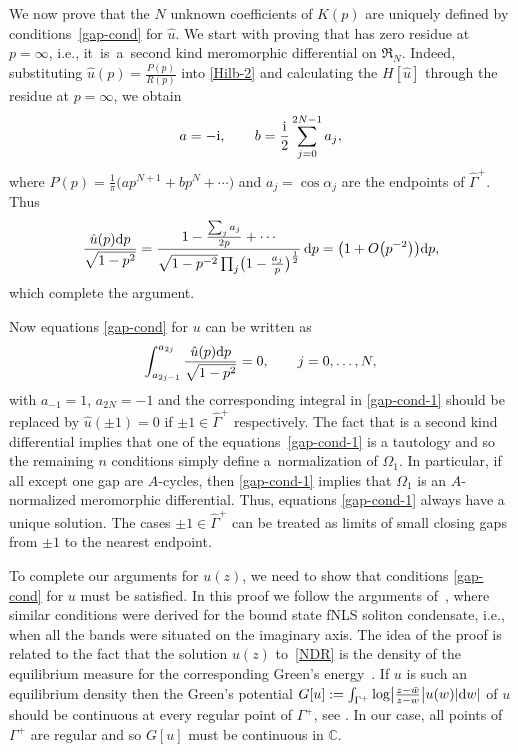 \documentclass[10pt,a4paper]{amsart}
\numberwithin{equation}{section}
\newcommand{\G}{\Gamma}
\def\C{{\mathbb C}}
\def\a{\alpha}
\def\hf{\frac{1}{2}}
\def\G{\Gamma}
\begin{document}
We now prove that the $N$ unknown coefficients of $K(p)$ are uniquely defined by conditions~\eqref{gap-cond} for $\hat u$. We start with proving that  has zero residue at $p=\infty$, i.e., it~is~a~second kind meromorphic differential on $\mathfrak{R}_N$. Indeed, substituting $\hat u(p)=\frac{P(p)}{R(p)}$ into \eqref{Hilb-2} and calculating the $H[\hat u]$ through the residue at $p=\infty$, we obtain
\begin{gather}\label{coeff-u}
a=-{\rm i}, \qquad b=\frac {\rm i}2\sum_{j=0}^{2N-1}a_j,
\end{gather}
where $P(p)={\frac{1}{\pi}\bigl(ap^{N+1}+bp^N+\cdots\bigr)}$ and $a_j=\cos\a_j$ are the endpoints of $\hat\G^+$. Thus
\begin{gather*}
\frac{\hat u(p){\rm d}p}{\sqrt{1-p^2}} =\frac{1-\frac{\sum_ja_j}{2p}+\cdots}{\sqrt{1-p^{-2}}\prod_j\bigl(1-\frac{a_j}{p}\bigr)^\hf}\,{\rm d}p=\bigl(1+ O\bigl(p^{-2}\bigr)\bigr){\rm d}p,
\end{gather*}
which complete the argument.


Now equations \eqref{gap-cond} for $u$ can be written as
\begin{gather}\label{gap-cond-1}
\int_{a_{2j-1}}^{a_{2j}}\frac{\hat u(p){\rm d}p}{\sqrt{1-p^2}}=0, \qquad j=0,\dots,N,
\end{gather}
with $a_{-1}=1$, $a_{2N}=-1$ and the corresponding integral in \eqref{gap-cond-1} should be replaced by ${\hat u(\pm 1)=0}$ if
$\pm 1\in\hat\G^+$ respectively.
The fact that  is a second kind differential implies that one of the equations~\eqref{gap-cond-1} is a tautology and so the remaining $n$ conditions simply define a~normalization of $\Omega_1$. In particular, if all except one gap are $A$-cycles, then \eqref{gap-cond-1} implies that $\Omega_1$ is an $A$-normalized meromorphic differential. Thus, equations \eqref{gap-cond-1} always have a unique solution. The cases $\pm 1\in\hat\G^+$ can be treated as limits of small closing gaps from $\pm 1$ to the nearest endpoint.

To complete our arguments for $u(z)$, we need to show that conditions \eqref{gap-cond} for $u$ must be satisfied. In this proof we follow the arguments of~\cite[Theorem~6.1]{KT2021}, where similar conditions were derived for the bound state fNLS soliton condensate, i.e., when all the bands were situated on the imaginary axis. The idea of the proof is related to the fact that the solution $u(z)$ to~\eqref{NDR} is the density of the equilibrium measure for the corresponding Green's energy~\cite{KT2021}.
If $u$ is such an equilibrium density then the Green's potential
$G[u]:=\int_{\G^+}\log\bigl|\frac{z-\bar w }{z-w}\bigr|u(w)|{\rm d}w|$ of $u$ should be continuous at every regular point of $\G^+$, see \cite{ST}. In our case, all points of $\G^+$ are regular and so $G[u]$ must be continuous in $\C$.
\end{document}
